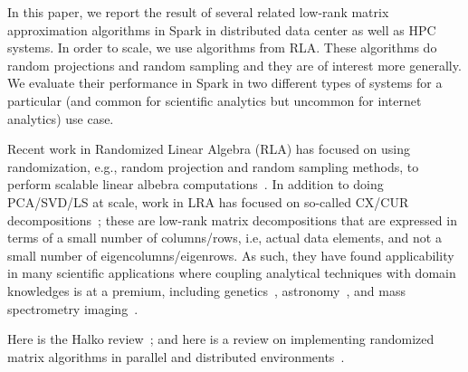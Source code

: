 In this paper, we report the result of several related low-rank matrix approximation algorithms in Spark in distributed data center as well as HPC systems.  
In order to scale, we use algorithms from RLA.
These algorithms do random projections and random sampling and they are of interest more generally.
We evaluate their performance in Spark in two different types of systems for a particular (and common for scientific analytics but uncommon for internet analytics) use case.

Recent work in Randomized Linear Algebra (RLA) has focused on using randomization, e.g., random projection and random sampling methods, to perform scalable linear albebra computations~\cite{Mah-mat-rev_BOOK}.
In addition to doing PCA/SVD/LS at scale, work in LRA has focused on so-called CX/CUR decompositions~\cite{DMM08_CURtheory_JRNL,CUR_PNAS}; these are low-rank matrix decompositions that are expressed in terms of a small number of columns/rows, i.e, actual data elements, and not a small number of eigencolumns/eigenrows.
As such, they have found applicability in many scientific applications where coupling analytical techniques with domain knowledges is at a premium, including genetics~\cite{Paschou07b}, astronomy~\cite{Yip14-AJ}, and mass spectrometry imaging~\cite{YRPMB15}.

Here is the Halko review~\cite{HMT09_SIREV}; and here is a review on implementing randomized matrix algorithms in parallel and distributed environments~\cite{YMM15_TR}.




